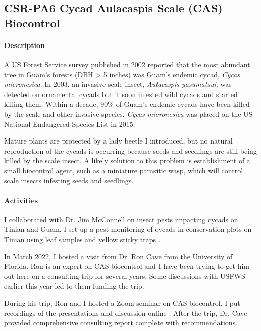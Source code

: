 \subsection{CSR-PA6 Cycad Aulacaspis Scale (CAS) Biocontrol}
\label{CASbiocontrol}
\begin{refsection}

\paragraph{Description}

A US Forest Service survey published in 2002 reported that the most
abundant tree in Guam's forests (DBH > 5 inches) was Guam's endemic
cycad, \emph{Cycas micronesica}. In 2003, an invasive scale insect,
\emph{Aulacaspis yasumatsui}, was detected on ornamental cycads but
it soon infested wild cycads and started killing them. Within a decade,
90\% of Guam\textquoteright s endemic cycads have been killed by the
scale and other invasive species. \emph{Cycas micronesica} was placed
on the US National Endangered Species List in 2015.

Mature plants are protected by a lady beetle I introduced, but no
natural reproduction of the cycads is occurring because seeds and seedlings are
still being killed by the scale insect. A likely solution to this
problem is establishment of a small biocontrol agent, such as a miniature
parasitic wasp, which will control scale insects infesting seeds and
seedlings.

\paragraph{Activities}

I collaborated with Dr. Jim McConnell on insect pests impacting cycads on Tinian and Guam. I set up a pest monitoring of cycads in conservation plots on Tinian using leaf samples \cite{moore_monitoring_2022} and yellow sticky traps \cite{moore_monitoring_2022-1}.

In March 2022, I hosted a visit from Dr. Ron Cave from the University of Florida. Ron is an expert on CAS biocontrol and I have been trying to get him out here on a consulting trip for several years. Some discussions with USFWS earlier this year led to them funding the trip.

During his trip, Ron and I hosted a Zoom seminar on CAS biocontrol. I put recordings of the presentations and discussion online \cite{cave_biological_2022-1}. After the trip, Dr. Cave provided \href{https://github.com/aubreymoore/CAS-biocontrol-seminar/raw/main/Cave-CAS-report-2022.pdf}{comprehensive consulting report complete with recommendations}. 


\end{refsection}
